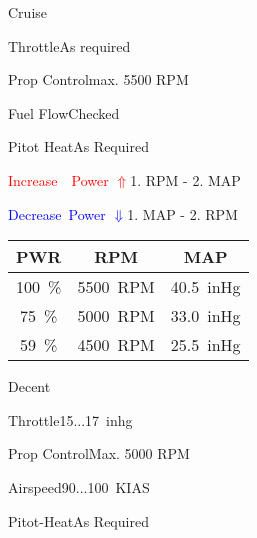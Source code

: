 \begin{checklist}{Cruise}
  \item{Throttle}{As required}
  \item{Prop Control}{max. 5500 RPM}
  \item{Fuel Flow}{Checked}
  \item{Pitot Heat}{As Required}

  \item{\textcolor{red}{Increase~~Power $\Uparrow$}}{1. RPM - 2. MAP}
  \item{\textcolor{blue}{Decrease~Power $\Downarrow$}}{1. MAP - 2. RPM}
    
\end{checklist}

\begin{table}[!ht]
  \large
  \centering
  \begin{tabular}{|c|c|c|}
  \hline
  \cellcolor{black!90}\color{white}\textbf{PWR} & \cellcolor{black!90}\color{white}\textbf{RPM}  & \cellcolor{black!90}\color{white}\textbf{MAP} \\ \hline

  100~\% & 5500~RPM & 40.5~inHg \\ \hline
  75~\% & 5000~RPM & 33.0~inHg \\ \hline
  59~\% & 4500~RPM & 25.5~inHg \\ \hline

  \end{tabular}
\end{table}


\begin{checklist}{Decent}
  \item{Throttle}{15...17~inhg}
  \item{Prop Control}{Max. 5000 RPM}
  \item{Airspeed}{90...100~KIAS}
  \item{Pitot-Heat}{As Required}
\end{checklist}

